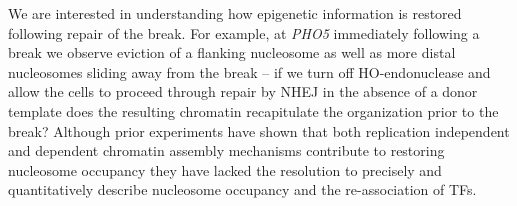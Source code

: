 We are interested in understanding how epigenetic information is restored following repair of the break. %
For example, at \textit{PHO5} immediately following a break we observe eviction of a flanking nucleosome as well as more distal nucleosomes sliding away from the break -- 
if we turn off HO-endonuclease and 
allow the cells to proceed through repair by NHEJ in the absence of a donor template %
does the resulting chromatin recapitulate the organization prior to the break? Although prior experiments have shown that both replication independent and dependent chromatin assembly mechanisms contribute to restoring nucleosome occupancy\citep{Li2016-wg}
they have lacked the resolution to precisely and quantitatively describe nucleosome occupancy and the re-association of TFs.
  

